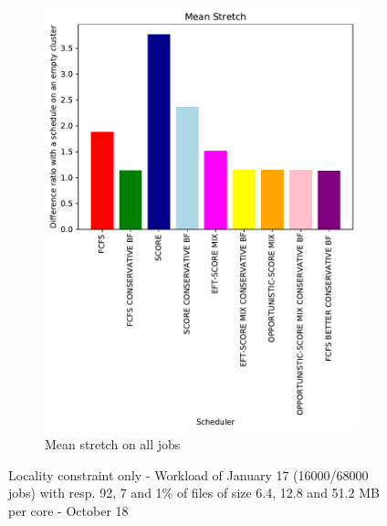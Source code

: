 \documentclass[a4paper]{article}
\begin{document}
\begin{figure}[H]
\begin{subfigure}[b]{0.4\linewidth}\centering\includegraphics[width=0.9\linewidth]{MBSS/plot/Results_FCFS_Score_Backfill_2022-01-17->2022-01-17_V9271_Mean_Stretch_450_128_32_256_4_1024.pdf}\caption{Mean stretch on all jobs}\end{subfigure}
\caption{Locality constraint only - Workload of January 17 (16000/68000 jobs) with resp. 92, 7 and 1\% of files of size 6.4, 12.8 and 51.2 MB per core - October 18}\end{figure}
\end{document}
